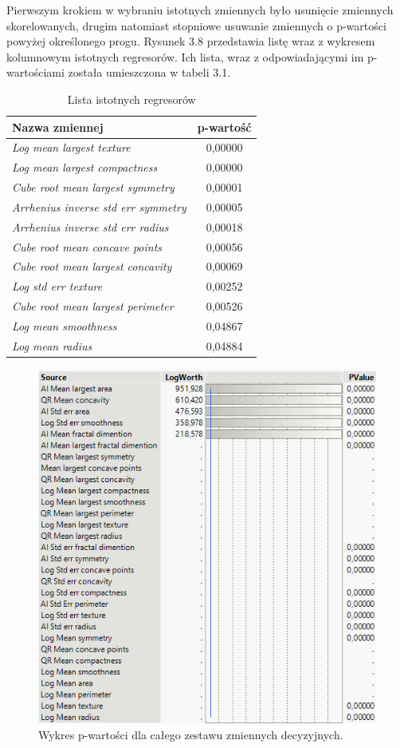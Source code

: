 Pierwszym krokiem w wybraniu istotnych zmiennych było usunięcie zmiennych skorelowanych, drugim natomiast stopniowe usuwanie zmiennych o p-wartości powyżej określonego progu. Rysunek 3.8 przedstawia listę wraz z wykresem kolumnowym istotnych regresorów. Ich lista, wraz z odpowiadającymi im p-wartościami została umieszczona w tabeli 3.1.

\begin{table}
	\centering
	\begin{tabular}{l|c}
		Nazwa zmiennej & p-wartość \\
		\hline
		\textit{Log mean largest texture} & 0,00000 \\
		\textit{Log mean largest compactness} & 0,00000 \\
		\textit{Cube root mean largest symmetry} & 0,00001 \\
		\textit{Arrhenius inverse std err symmetry} & 0,00005 \\
		\textit{Arrhenius inverse std err radius} & 0,00018 \\
		\textit{Cube root mean concave points} & 0,00056 \\
		\textit{Cube root mean largest concavity} & 0,00069 \\
		\textit{Log std err texture} & 0,00252 \\
		\textit{Cube root mean largest perimeter} & 0,00526 \\
		\textit{Log mean smoothness} & 0,04867 \\
		\textit{Log mean radius} & 0,04884
	\end{tabular}
	\caption{Lista istotnych regresorów}
	\label{lin_reg:1}
\end{table}

\begin{figure}[!ht]
	\centering
	\includegraphics[width=0.9\linewidth]{Rozdzial3/pvalue1}
	\caption{Wykres p-wartości dla całego zestawu zmiennych decyzyjnych.}
	\label{fig:pvalue1}
\end{figure}

